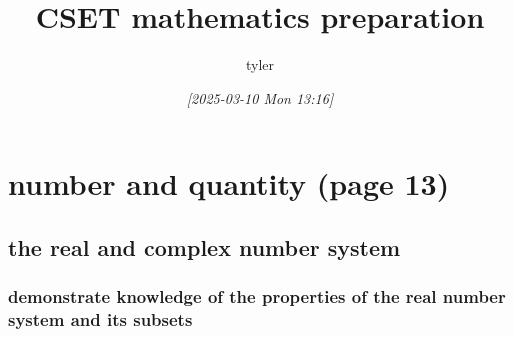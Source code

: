 \documentclass[11pt]{article}
\author{tyler}
\date{\textit{{[}2025-03-10 Mon 13:16]}}
\title{CSET mathematics preparation}
\begin{document}
\maketitle
\tableofcontents

\section{number and quantity (page 13)}
\label{sec:orga3488fe}
\subsection{the real and complex number system}
\label{sec:orgedca31b}
\subsubsection{demonstrate knowledge of the properties of the real number system and its subsets}
\label{sec:orgc0201e9}
\end{document}
